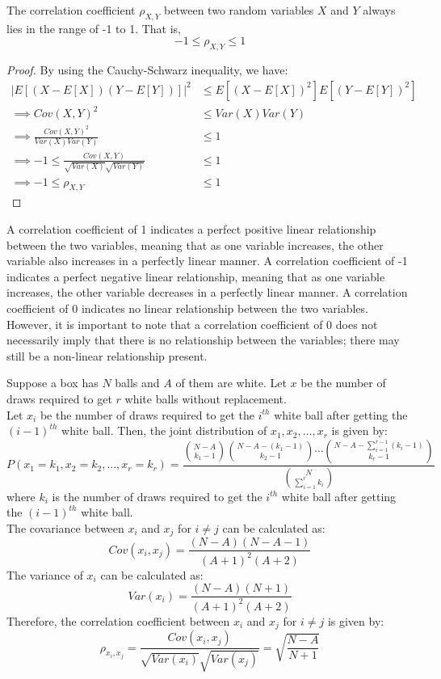 \documentclass[openany]{book}
\begin{document}
\begin{mytheorem}
    The correlation coefficient $\rho_{X,Y}$ between two random variables $X$ and $Y$ always lies in the range of -1 to 1. That is, 
    $$-1 \leq \rho_{X,Y} \leq 1$$
\end{mytheorem}
\begin{proof}
By using the Cauchy-Schwarz inequality, we have:
\begin{align*}
    |E[(X - E[X])(Y - E[Y])]|^2 &\leq E[(X - E[X])^2] E[(Y - E[Y])^2] \\
    \implies Cov(X, Y)^2 &\leq Var(X) Var(Y) \\
    \implies \frac{Cov(X, Y)^2}{Var(X) Var(Y)} &\leq 1 \\
    \implies -1 \leq \frac{Cov(X, Y)}{\sqrt{Var(X)} \sqrt{Var(Y)}} &\leq 1 \\
    \implies -1 \leq \rho_{X,Y} &\leq 1
\end{align*}
\end{proof}
\begin{mynote}
    A correlation coefficient of 1 indicates a perfect positive linear relationship between the two variables, meaning that as one variable increases, the other variable also increases in a perfectly linear manner. A correlation coefficient of -1 indicates a perfect negative linear relationship, meaning that as one variable increases, the other variable decreases in a perfectly linear manner. A correlation coefficient of 0 indicates no linear relationship between the two variables. However, it is important to note that a correlation coefficient of 0 does not necessarily imply that there is no relationship between the variables; there may still be a non-linear relationship present.
\end{mynote}
\begin{example}
    Suppose a box has $N$ balls and $A$ of them are white. Let $x$ be the number of draws required to get $r$ white balls without replacement. \\ 
    Let $x_i$ be the number of draws required to get the $i^{th}$ white ball after getting the $(i-1)^{th}$ white ball. Then, the joint distribution of $x_1, x_2, \ldots, x_r$ is given by:
    $$P(x_1 = k_1, x_2 = k_2, \ldots, x_r = k_r) = \frac{\binom{N - A}{k_1 - 1} \binom{N - A - (k_1 - 1)}{k_2 - 1} \cdots \binom{N - A - \sum_{i=1}^{r-1} (k_i - 1)}{k_r - 1}}{\binom{N}{\sum_{i=1}^{r} k_i}}$$
    where $k_i$ is the number of draws required to get the $i^{th}$ white ball after getting the $(i-1)^{th}$ white ball. \\
    The covariance between $x_i$ and $x_j$ for $i \neq j$ can be calculated as:
    $$Cov(x_i, x_j) = \frac{(N - A)(N - A - 1)}{(A + 1)^2 (A + 2)}$$
    The variance of $x_i$ can be calculated as:
    $$Var(x_i) = \frac{(N - A)(N + 1)}{(A + 1)^2 (A + 2)}$$
    Therefore, the correlation coefficient between $x_i$ and $x_j$ for $i\neq j$ is given by:
    $$\rho_{x_i, x_j} = \frac{Cov(x_i, x_j)}{\sqrt{Var(x_i)} \sqrt{Var(x_j)}} = \sqrt{\frac{N - A}{N + 1}}$$
\end{example}
\end{document}
